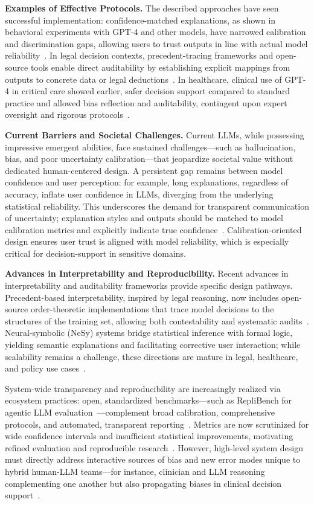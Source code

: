 \documentclass[sigconf]{acmart}
\begin{document}
\textbf{Examples of Effective Protocols.} The described approaches have seen successful implementation: confidence-matched explanations, as shown in behavioral experiments with GPT-4 and other models, have narrowed calibration and discrimination gaps, allowing users to trust outputs in line with actual model reliability~\cite{ref35}. In legal decision contexts, precedent-tracing frameworks and open-source tools enable direct auditability by establishing explicit mappings from outputs to concrete data or legal deductions~\cite{ref46}. In healthcare, clinical use of GPT-4 in critical care showed earlier, safer decision support compared to standard practice and allowed bias reflection and auditability, contingent upon expert oversight and rigorous protocols~\cite{ref53}.

\vspace{0.5em}
\noindent\textbf{Current Barriers and Societal Challenges.} 
Current LLMs, while possessing impressive emergent abilities, face sustained challenges—such as hallucination, bias, and poor uncertainty calibration—that jeopardize societal value without dedicated human-centered design. A persistent gap remains between model confidence and user perception: for example, long explanations, regardless of accuracy, inflate user confidence in LLMs, diverging from the underlying statistical reliability. This underscores the demand for transparent communication of uncertainty; explanation styles and outputs should be matched to model calibration metrics and explicitly indicate true confidence~\cite{ref35}. Calibration-oriented design ensures user trust is aligned with model reliability, which is especially critical for decision-support in sensitive domains.

\vspace{0.5em}
\noindent\textbf{Advances in Interpretability and Reproducibility.} 
Recent advances in interpretability and auditability frameworks provide specific design pathways. Precedent-based interpretability, inspired by legal reasoning, now includes open-source order-theoretic implementations that trace model decisions to the structures of the training set, allowing both contestability and systematic audits~\cite{ref46}. Neural-symbolic (NeSy) systems bridge statistical inference with formal logic, yielding semantic explanations and facilitating corrective user interaction; while scalability remains a challenge, these directions are mature in legal, healthcare, and policy use cases~\cite{ref44,ref52}.

System-wide transparency and reproducibility are increasingly realized via ecosystem practices: open, standardized benchmarks—such as RepliBench for agentic LLM evaluation~\cite{ref23}—complement broad calibration, comprehensive protocols, and automated, transparent reporting~\cite{ref23,ref42}. Metrics are now scrutinized for wide confidence intervals and insufficient statistical improvements, motivating refined evaluation and reproducible research~\cite{ref42}. However, high-level system design must directly address interactive sources of bias and new error modes unique to hybrid human-LLM teams—for instance, clinician and LLM reasoning complementing one another but also propagating biases in clinical decision support~\cite{ref53,ref52}.
\end{document}
